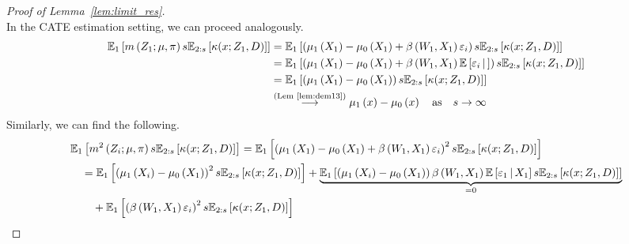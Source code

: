 \begin{proof}[Proof of Lemma~\ref{lem:limit_res}]
\begin{equation}
	\end{equation}
	In the CATE estimation setting, we can proceed analogously.
	\begin{equation}
		\begin{aligned}
			\mathbb{E}_{1}\left[m\left(Z_{1}; \mu, \pi\right) s \mathbb{E}_{2:s}\left[\kappa(x; Z_1, D)\right]\right]
			 & = \mathbb{E}_{1}\left[\left(\mu_1\left(X_{1}\right) - \mu_0\left(X_{1}\right) + \beta\left(W_{1}, X_{1}\right)\varepsilon_{i}\right) s \mathbb{E}_{2:s}\left[\kappa(x; Z_1, D)\right]\right]                                \\
			 & = \mathbb{E}_{1}\left[\left(\mu_1\left(X_{1}\right) - \mu_0\left(X_{1}\right) + \beta\left(W_{1}, X_{1}\right)\mathbb{E}\left[\varepsilon_{i} \, \middle| \, \right]\right) s \mathbb{E}_{2:s}\left[\kappa(x; Z_1, D)\right]\right] \\
			 & = \mathbb{E}_{1}\left[\left(\mu_1\left(X_{1}\right) - \mu_0\left(X_{1}\right)\right) s \mathbb{E}_{2:s}\left[\kappa(x; Z_1, D)\right]\right]                                                                                \\
			 & \overset{\text{(Lem~\ref{lem:dem13})}}{\longrightarrow} \mu_1\left(x\right) - \mu_0\left(x\right)
			\quad \text{as} \quad s \rightarrow \infty
		\end{aligned}
	\end{equation}
	Similarly, we can find the following.
	\begin{equation}
		\begin{aligned}
			 & \E_{1}\left[m^2\left(Z_{i}; \mu, \pi\right) s \E_{2:s}\left[\kappa(x; Z_1, D)\right]\right]
			= \E_{1}\left[\left(\mu_1\left(X_{1}\right) - \mu_0\left(X_{1}\right) + \beta\left(W_{1}, X_{1}\right)\varepsilon_{i}\right)^2 s \E_{2:s}\left[\kappa(x; Z_1, D)\right]\right]                                                                                             \\
			 & \quad = \E_{1}\left[\left(\mu_1\left(X_{i}\right) - \mu_0\left(X_{1}\right)\right)^2 s \E_{2:s}\left[\kappa(x; Z_1, D)\right]\right]
			+ \underbrace{\E_{1}\left[\left(\mu_1\left(X_{i}\right) - \mu_0\left(X_{1}\right)\right)\beta\left(W_{1}, X_{1}\right)\E\left[\varepsilon_{1} \, \middle| \, X_1\right] s \E_{2:s}\left[\kappa(x; Z_1, D)\right]\right]}_{=0}                                              \\
			 & \quad \quad + \E_{1}\left[\left(\beta\left(W_{1}, X_{1}\right)\varepsilon_{i}\right)^2 s \E_{2:s}\left[\kappa(x; Z_1, D)\right]\right]                                                                                                                                  \\

\end{aligned}
\end{equation}
\end{proof}
